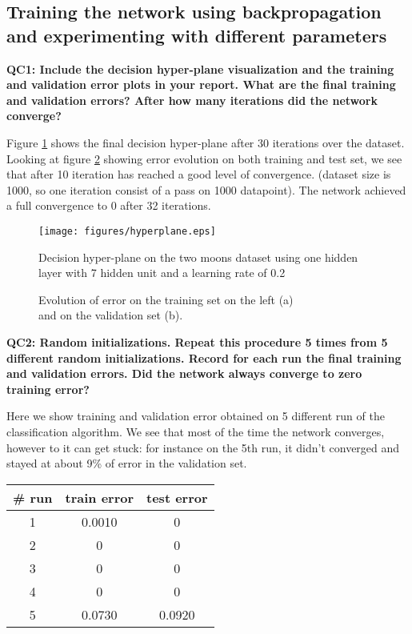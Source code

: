 \documentclass[a4paper,11pt]{exam}
\begin{document}
\subsection{Training the network using backpropagation and experimenting with different parameters}

\textbf{QC1: Include the decision hyper-plane visualization and the training and validation error plots in your report. What are the final training and validation errors? After how many iterations did the network converge?\\}

Figure \ref{hyperplane} shows the final decision hyper-plane after 30 iterations over the dataset. Looking at figure \ref{error} showing error evolution on both training and test set, we see that after 10 iteration has reached a good level of convergence. (dataset size is 1000, so one iteration consist of a pass on 1000 datapoint). The network achieved a full convergence to 0 after 32 iterations.\\ 

\begin{figure}[!h]
\centering
\texttt{[image: figures/hyperplane.eps]}
\caption{Decision hyper-plane on the two moons dataset using one hidden layer with 7 hidden unit and  a learning rate of 0.2}    
\label{hyperplane}
\end{figure}

\begin{figure}[!h]%
    \centering
    \qquad
    \caption{Evolution of error on the training set on the left (a)\\
     and  on the validation set (b).}%
    \label{error}%
\end{figure}

\textbf{QC2: Random initializations. Repeat this procedure 5 times from 5 different random initializations. Record for each run the final training and validation errors. Did the network always converge to zero training error?\\}

Here we show training and validation error obtained on 5 different run of the classification algorithm. We see that most of the time the network converges, however to it can get stuck: for instance on the 5th run, it didn't converged and stayed at about 9\% of error in the validation set. 
\begin{center}
\begin{tabular}{ c | c | c }
	\# run & train error & test error \\
	\hline
	   1 & 0.0010 & 0\\
           2 & 0 & 0\\
         3 & 0 & 0\\
         4 & 0 & 0\\
    	 5 & 0.0730 & 0.0920\\
	 \hline
\end{tabular}
\end{center}
\end{document}
